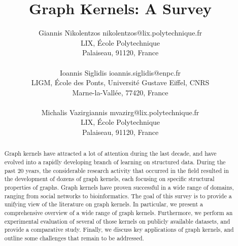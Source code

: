 \documentclass[twoside,11pt]{article}
\begin{document}
\title{Graph Kernels: A Survey}

\author{\name Giannis Nikolentzos \email nikolentzos@lix.polytechnique.fr \\
		\addr LIX, \'Ecole Polytechnique\\
       	Palaiseau, 91120, France\\ \\
       \name Ioannis Siglidis \email ioannis.siglidis@enpc.fr \\
       \addr LIGM, \'Ecole des Ponts, Universit\'e Gustave Eiffel, CNRS \\
       Marne-la-Vall\'ee, 77420, France\\ \\
       \name Michalis Vazirgiannis \email mvazirg@lix.polytechnique.fr \\
       \addr LIX, \'Ecole Polytechnique\\
       Palaiseau, 91120, France}



\maketitle


\begin{abstract}
Graph kernels have attracted a lot of attention during the last decade, and have evolved into a rapidly developing branch of learning on structured data.
During the past $20$ years, the considerable research activity that occurred in the field resulted in the development of dozens of graph kernels, each focusing on specific structural properties of graphs.
Graph kernels have proven successful in a wide range of domains, ranging from social networks to bioinformatics.
The goal of this survey is to provide a unifying view of the literature on graph kernels.
In particular, we present a comprehensive overview of a wide range of graph kernels.
Furthermore, we perform an experimental evaluation of several of those kernels on publicly available datasets, and provide a comparative study.
Finally, we discuss key applications of graph kernels, and outline some challenges that remain to be addressed. 
\end{abstract}
\end{document}
